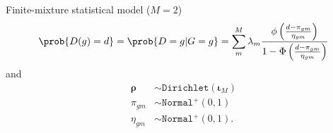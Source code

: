 \documentclass{article}
\begin{document}
    
 Finite-mixture statistical model ($M = 2$) 
 \begin{align*} 
 \prob{D(g) = d} = \prob{D = g | G = g} = \sum_m^M \lambda_m \frac{\phi\left(\frac{d - \pi_{gm}}{\eta_{gm}}\right)}{1 - \Phi\left(\frac{d - \pi_{gm}}{\eta_{gm}}\right)}  
 \end{align*} 
 and 
 \begin{align*} 
   \boldsymbol{\rho} &\sim \mathtt{Dirichlet}(\boldsymbol{\iota}_M) \\ 
   \pi_{gm} &\sim \mathtt{Normal^+}(0, 1) \\ 
   \eta_{gm} &\sim \mathtt{Normal^+}(0, 1). 
 \end{align*} 
\end{document}
